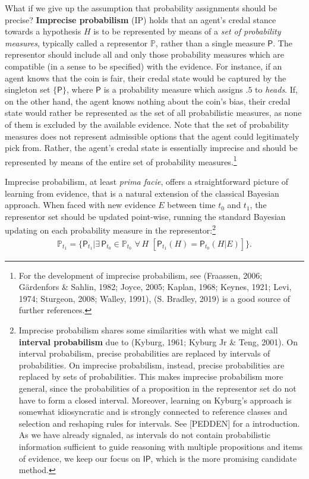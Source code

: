 \documentclass[
  10pt,
  dvipsnames,enabledeprecatedfontcommands]{scrartcl}
\newcommand{\s}[1]{\mbox{$\mathsf{#1}$}}
\begin{document}
What if we give up the assumption that probability assignments should be
precise? \textbf{Imprecise probabilism} (\textsf{IP}) holds that an
agent's credal stance towards a hypothesis \(H\) is to be represented by
means of a \emph{set of probability measures}, typically called a
representor \(\mathbb{P}\), rather than a single measure \(\mathsf{P}\).
The representor should include all and only those probability measures
which are compatible (in a sense to be specified) with the evidence. For
instance, if an agent knows that the coin is fair, their credal state
would be captured by the singleton set \(\{\mathsf{P}\}\), where
\(\mathsf{P}\) is a probability measure which assigns \(.5\) to
\emph{heads}. If, on the other hand, the agent knows nothing about the
coin's bias, their credal state would rather be represented as the set
of all probabilistic measures, as none of them is excluded by the
available evidence. Note that the set of probability measures does not
represent admissible options that the agent could legitimately pick
from. Rather, the agent's credal state is essentially imprecise and
should be represented by means of the entire set of probability
measures.\footnote{For the development of imprecise probabilism, see
  (Fraassen, 2006; Gärdenfors \& Sahlin, 1982; Joyce, 2005; Kaplan,
  1968; Keynes, 1921; Levi, 1974; Sturgeon, 2008; Walley, 1991), (S.
  Bradley, 2019) is a good source of further references.}

Imprecise probabilism, at least \emph{prima facie}, offers a
straightforward picture of learning from evidence, that is a natural
extension of the classical Bayesian approach. When faced with new
evidence \(E\) between time \(t_0\) and \(t_1\), the representor set
should be updated point-wise, running the standard Bayesian updating on
each probability measure in the representor:\footnote{Imprecise
  probabilism shares some similarities with what we might call
  \textbf{interval probabilism} due to (Kyburg, 1961; Kyburg Jr \& Teng,
  2001). On interval probabilism, precise probabilities are replaced by
  intervals of probabilities. On imprecise probabilism, instead, precise
  probabilities are replaced by sets of probabilities. This makes
  imprecise probabilism more general, since the probabilities of a
  proposition in the representor set do not have to form a closed
  interval. Moreover, learning on Kyburg's approach is somewhat
  idiosyncratic and is strongly connected to reference classes and
  selection and reshaping rules for intervals. See {[}PEDDEN{]} for a
  introduction. As we have already signaled, as intervals do not contain
  probabilistic information sufficient to guide reasoning with multiple
  propositions and items of evidence, we keep our focus on \s{IP}, which
  is the more promising candidate method.}
\begin{align*} \label{eq:updateRepresentor}
\mathbb{P}_{t_1} = \{\mathsf{P}_{t_1}\vert \exists\, {\mathsf{P}_{t_0} \!\in  \mathbb{P}_{t_0}}\,\, \forall\, {H}\,\, \left[\mathsf{P}_{t_1}(H)=\mathsf{P}_{t_0}(H \vert E)\right] \}.
\end{align*}
\end{document}
